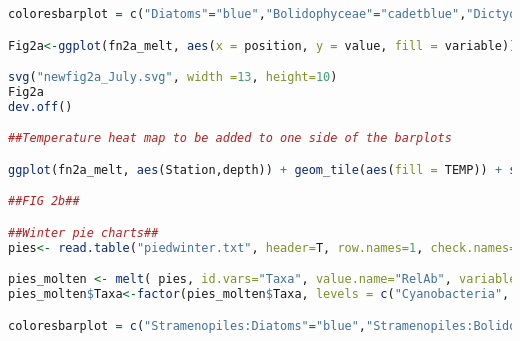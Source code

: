 \documentclass{article}
\begin{document}
\begin{lstlisting}[language=R,caption={N1N2figscripts}]
coloresbarplot = c("Diatoms"="blue","Bolidophyceae"="cadetblue","Dictyochophyceae"="lightskyblue","Pelagophyceae"="aquamarine","Chrysophyceae"="turquoise","Prymnesiophyceae"="darkgoldenrod3 ","Rappemonad"=	"gold2","Cryptophyceae"="coral3" ,"Micromonas"="forestgreen","Bathycoccus"="limegreen","OstreococcusII"="olivedrab","OstreococcusI"="palegreen4","PrasinophyceaeI"="greenyellow","Other plastid"="lightgreen","ASV357"="lemonchiffon3","ProchlorococcusHLI"="lightcoral","ProchlorococcusHLII"="hotpink","ProchlorococcusLLI"="maroon1","SynechococcusI"="blueviolet","SynechococcusII"="mediumpurple","SynechococcusIV"="plum3","Other Cyanobacteria"="mediumvioletred","others"="cornsilk4","Not assigned"="gray34")

Fig2a<-ggplot(fn2a_melt, aes(x = position, y = value, fill = variable)) + geom_bar(stat = "identity",width=.85)+ scale_fill_manual(values = coloresbarplot) + theme_bw()+ ylab("Relative contribution [%]") +theme(strip.background = element_blank(),strip.text.x = element_text(size=18),axis.text.y=element_text(size=16), axis.text.x=element_text(size=12,angle = 90, hjust = 1, vjust=.5), text = element_text(size=21),strip.text = element_text(size=22),axis.title.y=element_text(size=18),legend.text=element_text(size=14)) +facet_grid(~Station,scales = "free_x",space = "free_x")

svg("newfig2a_July.svg", width =13, height=10)
Fig2a
dev.off()

##Temperature heat map to be added to one side of the barplots 

ggplot(fn2a_melt, aes(Station,depth)) + geom_tile(aes(fill = TEMP)) + scale_fill_gradientn(colours = topo.colors(2))

##FIG 2b##

##Winter pie charts##
pies<- read.table("piedwinter.txt", header=T, row.names=1, check.names=F)

pies_molten <- melt( pies, id.vars="Taxa", value.name="RelAb", variable.name="Sample" )
pies_molten$Taxa<-factor(pies_molten$Taxa, levels = c("Cyanobacteria", "ASV357", "Prasinophyta", "Cryptophyceae", "Rappemonad", "Prymnesiophyceae", "Stramenopiles:Chrysophyceae", "Stramenopiles:Pelagophyceae", "Stramenopiles:Dictyochophyceae", "Stramenopiles:Bolidophyceae", "Stramenopiles:Diatoms", "others"))

coloresbarplot = c("Stramenopiles:Diatoms"="blue","Stramenopiles:Bolidophyceae"="cadetblue","Stramenopiles:Dictyochophyceae"="lightskyblue","Stramenopiles:Pelagophyceae"="aquamarine","Stramenopiles:Chrysophyceae"="turquoise","Prymnesiophyceae"="darkgoldenrod3","Rappemonad"="gold2","Cryptophyceae"="coral3","Prasinophyta"="forestgreen","ASV357"="lemonchiffon3","Cyanobacteria"="purple","others"="cornsilk4")


\end{lstlisting}
\end{document}
